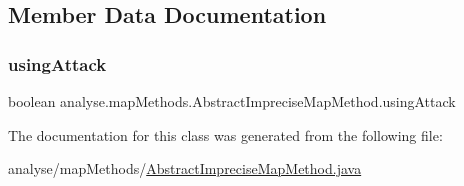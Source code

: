 \subsection{Member Data Documentation}
\mbox{\label{classanalyse_1_1map_methods_1_1_abstract_imprecise_map_method_a14956fa88bde1cf0654a3cf37c5b46be}} 
\subsubsection{\texorpdfstring{using\+Attack}{usingAttack}}
{\footnotesize\ttfamily boolean analyse.\+map\+Methods.\+Abstract\+Imprecise\+Map\+Method.\+using\+Attack\hspace{0.3cm}{\ttfamily [private]}}



The documentation for this class was generated from the following file\+:\begin{DoxyCompactItemize}
\item 
analyse/map\+Methods/\mbox{\hyperlink{_abstract_imprecise_map_method_8java}{Abstract\+Imprecise\+Map\+Method.\+java}}\end{DoxyCompactItemize}
